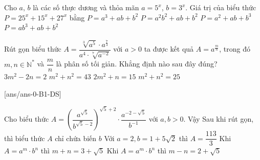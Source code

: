 \begin{ex}%
	Cho $a,\,b$ là các số thực dương và thỏa mãn $a=5^x$, $b=3^x$. Giá trị của biểu thức $P=25^x+15^x+27^x$ bằng
	\choice
	{$P=a^3+ab+b^2$}
	{$P=a^2b^2+ab+b^2$}
	{\True $P=a^2+ab+b^3$}
	{$P=a{b^3}+ab+b^2$}
\end{ex}

\begin{ex}%
	Rút gọn biểu thức $A=\dfrac{\sqrt[3]{a^5}\cdot a^{\tfrac{7}{3}}}{a^4\cdot\sqrt[7]{a^{-2}}}$ với $a > 0$ ta được kết quả $A=a^{\tfrac{m}{n}}$, trong đó $m, n\in\mathbb{N}^*$ và $\dfrac{m}{n}$ là phân số tối giản. Khẳng định nào sau đây đúng?
	\choice
	{$3m^2-2n=2$}
	{$m^2+n^2=43$}
	{\True $2m^2+n=15$}
	{$m^2+n^2=25$}
\end{ex}
\cauds
{}[ans/ans-0-B1-DS]

\begin{ex}
	Cho biểu thức $ A=\left(\dfrac{a^{\sqrt 5}}{b^{\sqrt 5-2}}\right)^{\sqrt 5+2}\cdot\dfrac{a^{-2-\sqrt 5}}{b^{-1}}$ với $ a,b > 0$. Vậy
	\choiceTF
	{Sau khi rút gọn, thì biểu thức $ A$ chỉ chứa biến $ b$}
	{Với $ a=2,b=1+5\sqrt 2 $ thì $ A=\dfrac{113}{3}$}
	{\True Khi $ A=a^m\cdot b^n$ thì $ m+n=3+\sqrt 5 $}
	{Khi $ A=a^m\cdot b^n$ thì $ m-n=2+\sqrt 5 $}
\end{ex}

